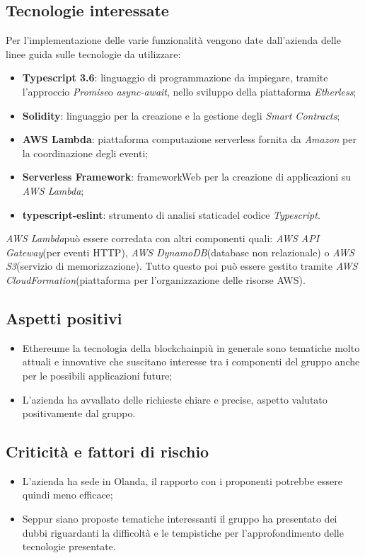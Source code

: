 \subsection{Tecnologie interessate}
    Per l'implementazione delle varie funzionalità vengono date dall'azienda delle linee guida sulle tecnologie da utilizzare:
    \begin{itemize}
        \item \textbf{Typescript 3.6}\glo: linguaggio di programmazione da impiegare, tramite l'approccio \textit{Promise}\glosp o \textit{async-await}\glo, nello sviluppo della piattaforma \textit{Etherless};
        \item \textbf{Solidity}\glo: linguaggio per la creazione e la gestione degli \textit{Smart Contracts}\glo;
        \item \textbf{AWS Lambda}\glo: piattaforma computazione serverless fornita da \textit{Amazon} per la coordinazione degli eventi;
        \item \textbf{Serverless Framework}\glo: framework\glosp Web per la creazione di applicazioni su \textit{AWS Lambda}\glo;
        \item \textbf{typescript-eslint}\glo: strumento di analisi statica\glosp del codice \textit{Typescript}\glo.
    \end{itemize}
    \textit{AWS Lambda}\glosp può essere corredata con altri componenti quali: \textit{AWS API Gateway}\glosp (per eventi HTTP\glo), \textit{AWS DynamoDB}\glosp (database non relazionale\glo)
    o \textit{AWS S3}\glosp (servizio di memorizzazione). Tutto questo poi può essere gestito tramite \textit{AWS CloudFormation}\glosp (piattaforma per l'organizzazione delle
    risorse AWS).
\subsection{Aspetti positivi}
\begin{itemize}
    \item Ethereum\glosp e la tecnologia della blockchain\glosp più in generale sono tematiche molto attuali e innovative che suscitano interesse tra i componenti del gruppo
    anche per le possibili applicazioni future;
    \item L'azienda ha avvallato delle richieste chiare e precise, aspetto valutato positivamente dal gruppo.
\end{itemize}
\subsection{Criticità e fattori di rischio}
\begin{itemize}
    \item L'azienda ha sede in Olanda, il rapporto con i proponenti potrebbe essere quindi meno efficace;
    \item Seppur siano proposte tematiche interessanti il gruppo ha presentato dei dubbi riguardanti la difficoltà e le tempistiche per l'approfondimento
    delle tecnologie presentate.
\end{itemize}
